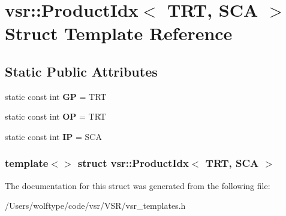 \hypertarget{structvsr_1_1_product_idx_3_01_t_r_t_00_01_s_c_a_01_4}{\section{vsr\-:\-:Product\-Idx$<$ T\-R\-T, S\-C\-A $>$ Struct Template Reference}
\label{structvsr_1_1_product_idx_3_01_t_r_t_00_01_s_c_a_01_4}
}
\subsection*{Static Public Attributes}
\begin{DoxyCompactItemize}
\item 
\hypertarget{structvsr_1_1_product_idx_3_01_t_r_t_00_01_s_c_a_01_4_a0c8db0687d5fb172e55cc5dafb9c5e91}{static const int {\bfseries G\-P} = T\-R\-T}\label{structvsr_1_1_product_idx_3_01_t_r_t_00_01_s_c_a_01_4_a0c8db0687d5fb172e55cc5dafb9c5e91}

\item 
\hypertarget{structvsr_1_1_product_idx_3_01_t_r_t_00_01_s_c_a_01_4_a5af43ff39bd7669416e5dc873a68dc35}{static const int {\bfseries O\-P} = T\-R\-T}\label{structvsr_1_1_product_idx_3_01_t_r_t_00_01_s_c_a_01_4_a5af43ff39bd7669416e5dc873a68dc35}

\item 
\hypertarget{structvsr_1_1_product_idx_3_01_t_r_t_00_01_s_c_a_01_4_a42b755e82ba959054288d5f5905bf3f4}{static const int {\bfseries I\-P} = S\-C\-A}\label{structvsr_1_1_product_idx_3_01_t_r_t_00_01_s_c_a_01_4_a42b755e82ba959054288d5f5905bf3f4}

\end{DoxyCompactItemize}
\subsubsection*{template$<$$>$ struct vsr\-::\-Product\-Idx$<$ T\-R\-T, S\-C\-A $>$}



The documentation for this struct was generated from the following file\-:\begin{DoxyCompactItemize}
\item 
/\-Users/wolftype/code/vsr/\-V\-S\-R/vsr\-\_\-templates.\-h\end{DoxyCompactItemize}
